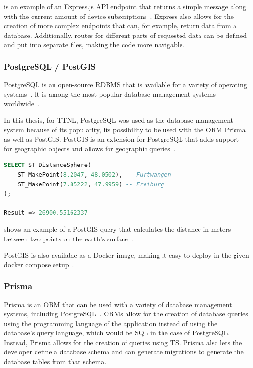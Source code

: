  is an example of an Express.js \ac{API} endpoint that returns a simple message along with the current amount of device subscriptions~\cite{noauthor_express_nodate-1}.
Express also allows for the creation of more complex endpoints that can, for example, return data from a database.
Additionally, routes for different parts of requested data can be defined and put into separate files, making the code more navigable.

\subsubsection{PostgreSQL / PostGIS}

PostgreSQL is an open-source \ac{RDBMS} that is available for a variety of operating systems~\cite{postgresql_global_development_group_postgresql_2023}.
It is among the most popular database management systems worldwide~\cite{db-engines_most_2023}.

In this thesis, for \ac{TTNL}, PostgreSQL was used as the database management system because of its popularity, its possibility to be used with the \ac{ORM} Prisma as well as PostGIS.
PostGIS is an extension for PostgreSQL that adds support for geographic objects and allows for geographic queries~\cite{postgis_psc__osgeo_postgis_2023}.

\begin{lstlisting}[language=SQL, float, caption={Example of a PostGIS query to calculate the distance between two geolocation points in meters}, label={lst:postgis-example-distance}]
SELECT ST_DistanceSphere(
    ST_MakePoint(8.2047, 48.0502), -- Furtwangen
    ST_MakePoint(7.85222, 47.9959) -- Freiburg
);

Result => 26900.55162337
\end{lstlisting}

 shows an example of a PostGIS query that calculates the distance in meters between two points on the earth's surface~\cite{noauthor_st_distancesphere_nodate}.

PostGIS is also available as a Docker image, making it easy to deploy in the given docker compose setup~\cite{docker_inc_postgispostgis_2023}.

\subsubsection{Prisma}

Prisma is an \ac{ORM} that can be used with a variety of database management systems, including PostgreSQL~\cite{prisma_data_inc_prisma_2023}.
\acp{ORM} allow for the creation of database queries using the programming language of the application instead of using the database's query language, which would be \ac{SQL} in the case of PostgreSQL.
Instead, Prisma allows for the creation of queries using \ac{TS}.
Prisma also lets the developer define a database schema and can generate migrations to generate the database tables from that schema.

